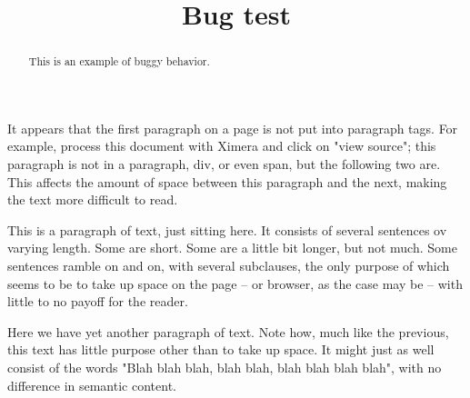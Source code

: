 \documentclass{ximera}
\title{Bug test}
\begin{document}
\begin{abstract}
This is an example of buggy behavior.
\end{abstract}
\maketitle

It appears that the first paragraph on a page is not put into paragraph tags. For example, process this document with Ximera and click on "view source"; this paragraph is not in a paragraph, div, or even span, but the following two are. This affects the amount of space between this paragraph and the next, making the text more difficult to read.

This is a paragraph of text, just sitting here. It consists of several sentences ov varying length. Some are short. Some are a little bit longer, but not much. Some sentences ramble on and on, with several subclauses, the only purpose of which seems to be to take up space on the page -- or browser, as the case may be -- with little to no payoff for the reader.

Here we have yet another paragraph of text. Note how, much like the previous, this text has little purpose other than to take up space. It might just as well consist of the words "Blah blah blah, blah blah, blah blah blah blah", with no difference in semantic content.
\end{document}
